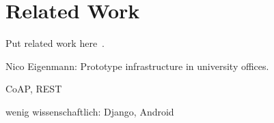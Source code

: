 
\chapter{Related Work}
\label{sec:relatedwork}

Put related work here~\cite{mattern2010ict}.

Nico Eigenmann: Prototype infrastructure in university offices\cite{eigenmann2012opportunisticSensing}.

CoAP, REST

wenig wissenschaftlich: Django, Android